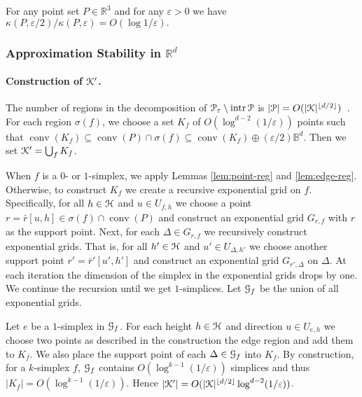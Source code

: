 \documentclass[11pt]{myclass}
\newcommand{\eps}{\varepsilon}
\renewcommand{\c}[1]{\ensuremath{\EuScript{#1}}}
\renewcommand{\b}[1]{\ensuremath{\mathbb{#1}}}
\def\kernel{\EuScript{K}}
\newcommand{\conv}[1]{\mathop{\mathrm{conv}}(#1)}
\newcommand{\polyt}{\EuScript{P}}
\newcommand{\ball}{\mathbb{B}}
\newcommand{\intr}{\mathop{\mathrm{intr}}}
\newcommand{\fr}{\bar{r}}
\newcommand{\point}[3]{{#1}[#3,#2]}
\begin{document}
\begin{theorem}
For any point set $P \in \b{R}^3$ and for any $\eps > 0$ we have 
$
\kappa(P, \eps/2) / \kappa(P,\eps) = O(\log 1/\eps).
$
\end{theorem}


\subsubsection{Approximation Stability in $\b{R}^d$}

\paragraph{Construction of $\kernel'$.}
The number of regions in the decomposition of $\polyt_\eps \setminus \intr \polyt$ is $|\polyt| = O(|\kernel|^{\lfloor d/2 \rfloor})$~\cite{Zie95}.  For each region $\sigma(f)$, we choose a set $K_f$ of $O(\log^{d-2} (1/\eps))$ points such that 
$
\conv{K_f} \subseteq \conv{P} \cap \sigma(f) \subseteq \conv{K_f} \oplus (\eps/2)\ball^d.
$ 
Then we set $\kernel' = \bigcup_f K_f$.

When $f$ is a $0$- or $1$-simplex, we apply Lemmas \ref{lem:point-reg}  and \ref{lem:edge-reg}.  
Otherwise, to construct $K_f$ we create a recursive exponential grid on $f$.  
Specifically, for all $h \in \c{H}$ and $u \in U_{f,h}$ we choose a point $r = \point{\fr}{h}{u} \in \sigma(f) \cap \conv{P}$ and construct an exponential grid $G_{r,f}$ with $r$ as the support point.  
Next, for each $\Delta \in G_{r,f}$ we recursively construct exponential grids.  That is, for all $h' \in \c{H}$ and $u' \in U_{\Delta,h'}$ we choose another support point $r' = \point{\fr'}{h'}{u'}$ and construct an exponential grid $G_{r',\Delta}$ on $\Delta$.  
At each iteration the dimension of the simplex in the exponential grids drops by one.  We continue the recursion until we get $1$-simplices.  
Let $\c{G}_f$ be the union of all exponential grids.  

Let $e$ be a $1$-simplex in $\c{G}_f$.  For each height $h \in \c{H}$ and direction $u \in U_{e,h}$ we choose two points as described in the construction the edge region and add them to $K_f$.  
We also place the support point of each $\Delta \in \c{G}_f$ into $K_f$.  
By construction, for a $k$-simplex $f$, $\c{G}_f$ contains $O(\log^{k-1} (1/\eps))$ simplices and thus $|K_f| = O(\log^{k-1} (1/\eps))$.  Hence $|\kernel'| = O(|\kernel|^{\lfloor d/2 \rfloor} \log^{d-2} (1/\eps))$.  
\end{document}
